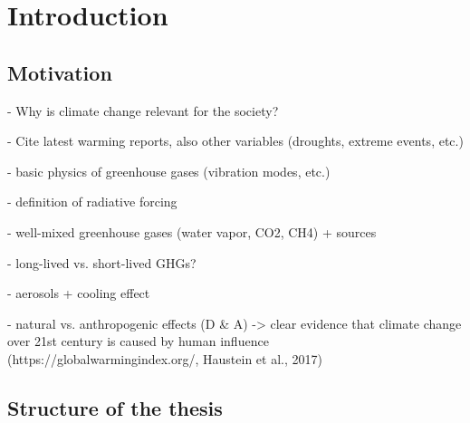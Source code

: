 


\chapter{Introduction}
\label{ch:01:introduction}


\section{Motivation}
\label{ch:01:motivation}

- Why is climate change relevant for the society?

- Cite latest warming reports, also other variables (droughts, extreme events,
etc.)

- basic physics of greenhouse gases (vibration modes, etc.)

- definition of radiative forcing

- well-mixed greenhouse gases (water vapor, CO2, CH4) + sources

- long-lived vs. short-lived GHGs?

- aerosols + cooling effect

- natural vs. anthropogenic effects (D \& A) -> clear evidence that climate
change over 21st century is caused by human influence
(https://globalwarmingindex.org/, Haustein et al., 2017)


\section{Structure of the thesis}
\label{sec:01:structure}

